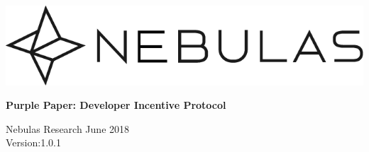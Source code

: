 \documentclass[12pt]{article}
\begin{document}
\pagestyle{empty}

\pagecolor{\pcolor}

\begin{titlepage}
  \begin{center}
    \vspace*{5.5cm}
    \includegraphics[scale=0.5]{../common/Nebulas.png}
    \vspace{0.5cm}


    \textbf{\huge{Purple Paper: Developer Incentive Protocol}}

    \vspace{0.5cm}
    Nebulas Research
    \vfill
    June 2018\\
    Version:1.0.1
    \textbf{}
  \end{center}

\end{titlepage}
\setcounter{page}{0}
\tableofcontents
\newpage
\setcounter{page}{1}
\pagestyle{fancy}
\vspace*{0.01cm}
%


%

%


\newpage
\begin{appendices}

%
\end{appendices}
\end{document}

